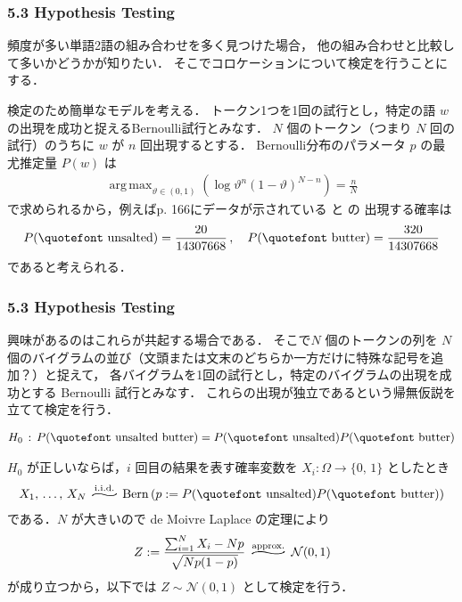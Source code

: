 \documentclass[9pt,leqno]{beamer}
\DeclareMathOperator*{\argmax}{arg\,max}
\newcommand{\uprightquote}[1]{\normalfont{\quotefont #1}}
\begin{document}
\begin{frame}
    \frametitle{5.3 Hypothesis Testing}
    頻度が多い単語2語の組み合わせを多く見つけた場合，
    他の組み合わせと比較して多いかどうかが知りたい．
    そこでコロケーションについて検定を行うことにする．

    \bigskip

    検定のため簡単なモデルを考える．
    トークン1つを1回の試行とし，特定の語 $w$ の出現を成功と捉えるBernoulli試行とみなす．
    $N$ 個のトークン（つまり $N$ 回の試行）のうちに $w$ が $n$ 回出現するとする．
    Bernoulli分布のパラメータ $p$ の最尤推定量 $P(w)$ は
    \begin{align*}
            \argmax_{\vartheta \in (0,1)}\left(\log \vartheta^n(1 - \vartheta)^{N - n}\right) = \frac{n}{N}
    \end{align*}
    で求められるから，例えばp. 166にデータが示されている \uprightquote{unsalted} と \uprightquote{butter} の
    出現する確率は
    \begin{align*}
        P(\text{\uprightquote{unsalted}}) = \frac{20}{14307668}\,, \quad P(\text{\uprightquote{butter}}) = \frac{320}{14307668}
    \end{align*}
    であると考えられる．

\end{frame}

\begin{frame}
    \frametitle{5.3 Hypothesis Testing}
    興味があるのはこれらが共起する場合である．
    そこで$N$ 個のトークンの列を $N$ 個のバイグラムの並び（文頭または文末のどちらか一方だけに特殊な記号を追加？）と捉えて，
    各バイグラムを1回の試行とし，特定のバイグラムの出現を成功とする Bernoulli 試行とみなす．
    これらの出現が独立であるという帰無仮説を立てて検定を行う．
    
    \begin{align*}
        H_0 \,:\, P(\text{\uprightquote{unsalted butter}}) = P(\text{\uprightquote{unsalted}}) P(\text{\uprightquote{butter}})
    \end{align*}

    \bigskip

    $H_0$ が正しいならば，$i$ 回目の結果を表す確率変数を $X_i:\varOmega \to \{0,\,1\}$ としたとき
    \begin{align*}
        X_1,\,\ldots,\,X_N \stackrel{\mathrm{i.i.d.}}{\mbox{\scalebox{3}[1]{$\sim$}}}
        \mathrm{Bern}\left(p := P(\text{\uprightquote{unsalted}}) P(\text{\uprightquote{butter}})\right)
    \end{align*}
    である．$N$ が大きいので de Moivre Laplace の定理により
    \begin{align*}
        Z := \frac{\sum_{i = 1}^N X_i - Np}{\sqrt{Np(1-p)}}
        \stackrel{\mathrm{approx.}}{\mbox{\scalebox{4}[1]{$\sim$}}} \mathcal{N}(0,1)
    \end{align*}
    が成り立つから，以下では $Z \sim \mathcal{N}(0,1)$ として検定を行う．
\end{frame}
\end{document}
